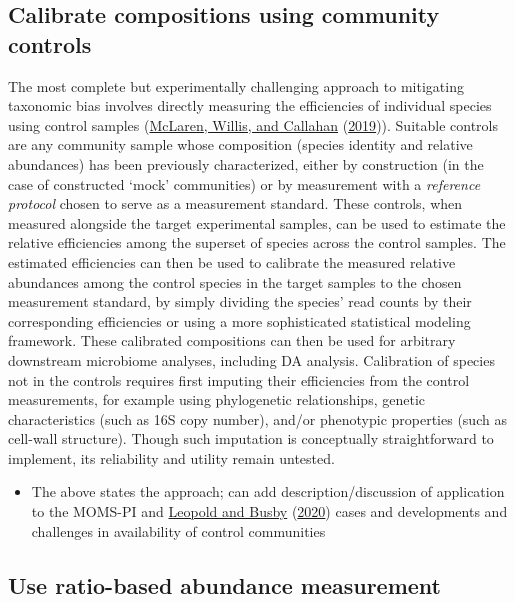 \documentclass[
]{article}
\providecommand{\tightlist}{%
  \setlength{\itemsep}{0pt}\setlength{\parskip}{0pt}}
\theoremstyle{definition}
\theoremstyle{definition}
\theoremstyle{definition}
\theoremstyle{definition}
\theoremstyle{remark}
\begin{document}
\hypertarget{calibrate-compositions}{%
\subsection{Calibrate compositions using community controls}\label{calibrate-compositions}}

The most complete but experimentally challenging approach to mitigating taxonomic bias involves directly measuring the efficiencies of individual species using control samples (\protect\hyperlink{ref-mclaren2019cons}{McLaren, Willis, and Callahan} (\protect\hyperlink{ref-mclaren2019cons}{2019})).
Suitable controls are any community sample whose composition (species identity and relative abundances) has been previously characterized, either by construction (in the case of constructed `mock' communities) or by measurement with a \emph{reference protocol} chosen to serve as a measurement standard.
These controls, when measured alongside the target experimental samples, can be used to estimate the relative efficiencies among the superset of species across the control samples.
The estimated efficiencies can then be used to calibrate the measured relative abundances among the control species in the target samples to the chosen measurement standard, by simply dividing the species' read counts by their corresponding efficiencies or using a more sophisticated statistical modeling framework.
These calibrated compositions can then be used for arbitrary downstream microbiome analyses, including DA analysis.
Calibration of species not in the controls requires first imputing their efficiencies from the control measurements, for example using phylogenetic relationships, genetic characteristics (such as 16S copy number), and/or phenotypic properties (such as cell-wall structure).
Though such imputation is conceptually straightforward to implement, its reliability and utility remain untested.

\begin{itemize}
\tightlist
\item
  The above states the approach; can add description/discussion of application to the MOMS-PI and \protect\hyperlink{ref-leopold2020host}{Leopold and Busby} (\protect\hyperlink{ref-leopold2020host}{2020}) cases and developments and challenges in availability of control communities
\end{itemize}

\hypertarget{use-ratio-based-abundance-measurement}{%
\subsection{Use ratio-based abundance measurement}\label{use-ratio-based-abundance-measurement}}
\end{document}
